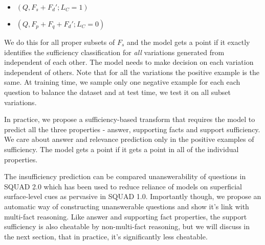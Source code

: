 
\begin{itemize}[noitemsep]
    \item $(Q, F_s + F_d'; L_C=1)$
    \item $(Q, F_p + F_q + F_d'; L_C=0)$
\end{itemize}

We do this for all proper subsets of $F_s$ and the model gets a point if it exactly identifies the sufficiency classification for \textit{all} variations generated from independent of each other.  The model needs to make decision on each variation independent of others. Note that for all the variations the positive example is the same. At training time, we sample only one negative example for each each question to balance the dataset and at test time, we test it on all subset variations.

In practice, we propose a sufficiency-based transform that requires the model to predict all the three properties - answer, supporting facts and support sufficiency. We care about answer and relevance prediction only in the positive examples of sufficiency. The model gets a point if it gets a point in all of the individual properties.

The insufficiency prediction can be compared unanswerability of questions in SQUAD 2.0 which has been used to reduce reliance of models on superficial surface-level cues as pervasive in SQUAD 1.0. Importantly though, we propose an automatic way of constructing unanswerable questions and show it's link with multi-fact reasoning. Like answer and supporting fact properties, the support sufficiency is also cheatable by non-multi-fact reasoning, but we will discuss in the next section, that in practice, it's significantly less cheatable.




